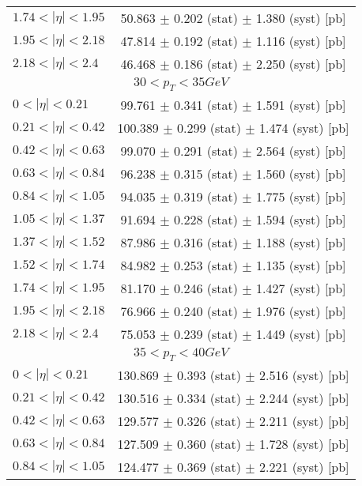 \begin{tabular}{lc}
$1.74 < |\eta| <1.95$          & 50.863 $\pm$ 0.202 (stat) $\pm$ 1.380 (syst) [pb]  \\
$1.95 < |\eta| <2.18$          & 47.814 $\pm$ 0.192 (stat) $\pm$ 1.116 (syst) [pb]  \\
$2.18 < |\eta| <2.4$           & 46.468 $\pm$ 0.186 (stat) $\pm$ 2.250 (syst) [pb]  \\
\hline
\multicolumn{2}{c}{$30 < p_{T} < 35 GeV$} \\
\hline
$0 < |\eta| <0.21$             & 99.761 $\pm$ 0.341 (stat) $\pm$ 1.591 (syst) [pb]  \\
$0.21 < |\eta| <0.42$          & 100.389 $\pm$ 0.299 (stat) $\pm$ 1.474 (syst) [pb]  \\
$0.42 < |\eta| <0.63$          & 99.070 $\pm$ 0.291 (stat) $\pm$ 2.564 (syst) [pb]  \\
$0.63 < |\eta| <0.84$          & 96.238 $\pm$ 0.315 (stat) $\pm$ 1.560 (syst) [pb]  \\
$0.84 < |\eta| <1.05$          & 94.035 $\pm$ 0.319 (stat) $\pm$ 1.775 (syst) [pb]  \\
$1.05 < |\eta| <1.37$          & 91.694 $\pm$ 0.228 (stat) $\pm$ 1.594 (syst) [pb]  \\
$1.37 < |\eta| <1.52$          & 87.986 $\pm$ 0.316 (stat) $\pm$ 1.188 (syst) [pb]  \\
$1.52 < |\eta| <1.74$          & 84.982 $\pm$ 0.253 (stat) $\pm$ 1.135 (syst) [pb]  \\
$1.74 < |\eta| <1.95$          & 81.170 $\pm$ 0.246 (stat) $\pm$ 1.427 (syst) [pb]  \\
$1.95 < |\eta| <2.18$          & 76.966 $\pm$ 0.240 (stat) $\pm$ 1.976 (syst) [pb]  \\
$2.18 < |\eta| <2.4$           & 75.053 $\pm$ 0.239 (stat) $\pm$ 1.449 (syst) [pb]  \\
\hline
\multicolumn{2}{c}{$35 < p_{T} < 40 GeV$} \\
\hline
$0 < |\eta| <0.21$             & 130.869 $\pm$ 0.393 (stat) $\pm$ 2.516 (syst) [pb]  \\
$0.21 < |\eta| <0.42$          & 130.516 $\pm$ 0.334 (stat) $\pm$ 2.244 (syst) [pb]  \\
$0.42 < |\eta| <0.63$          & 129.577 $\pm$ 0.326 (stat) $\pm$ 2.211 (syst) [pb]  \\
$0.63 < |\eta| <0.84$          & 127.509 $\pm$ 0.360 (stat) $\pm$ 1.728 (syst) [pb]  \\
$0.84 < |\eta| <1.05$          & 124.477 $\pm$ 0.369 (stat) $\pm$ 2.221 (syst) [pb]  \\

\end{tabular}
